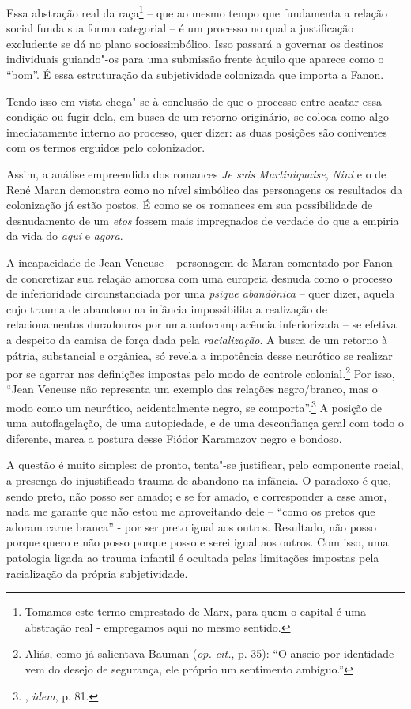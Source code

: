 Essa abstração real da raça\footnote{Tomamos este termo emprestado de
  Marx, para quem o capital é uma abstração real - empregamos aqui no
  mesmo sentido.} -- que ao mesmo tempo que fundamenta a relação social
funda sua forma categorial -- é um processo no qual a justificação
excludente se dá no plano sociossimbólico. Isso passará a governar os
destinos individuais guiando"-os para uma submissão frente àquilo que
aparece como o ``bom''. É essa estruturação da subjetividade colonizada
que importa a Fanon.

Tendo isso em vista chega"-se à conclusão de que o processo entre acatar
essa condição ou fugir dela, em busca de um retorno originário, se
coloca como algo imediatamente interno ao processo, quer dizer: as duas
posições são coniventes com os termos erguidos pelo colonizador.

Assim, a análise empreendida dos romances \emph{Je suis Martiniquaise},
\emph{Nini} e o de René Maran demonstra como no nível simbólico das
personagens os resultados da colonização já estão postos. É como se os
romances em sua possibilidade de desnudamento de um \emph{etos} fossem
mais impregnados de verdade do que a empiria da vida do \emph{aqui} e
\emph{agora}.

A incapacidade de Jean Veneuse -- personagem de Maran comentado por
Fanon -- de concretizar sua relação amorosa com uma europeia desnuda
como o processo de inferioridade circunstanciada por uma \emph{psique
abandônica} -- quer dizer, aquela cujo trauma de abandono na infância
impossibilita a realização de relacionamentos duradouros por uma
autocomplacência inferiorizada -- se efetiva a despeito da camisa de
força dada pela \emph{racialização}. A busca de um retorno à pátria,
substancial e orgânica, só revela a impotência desse neurótico se
realizar por se agarrar nas definições impostas pelo modo de controle
colonial.\footnote{Aliás, como já salientava Bauman (\emph{op. cit.}, p. 35):
  ``O anseio por identidade vem do desejo de segurança, ele próprio um
  sentimento ambíguo.''} Por isso, ``Jean Veneuse não representa um
exemplo das relações negro/branco, mas o modo como um neurótico,
acidentalmente negro, se comporta''.\footnote{, \emph{idem}, p. 81.} A
posição de uma autoflagelação, de uma autopiedade, e de uma desconfiança
geral com todo o diferente, marca a postura desse Fiódor Karamazov negro
e bondoso.

A questão é muito simples: de pronto, tenta"-se justificar, pelo
componente racial, a presença do injustificado trauma de abandono na
infância. O paradoxo é que, sendo preto, não posso ser amado; e se for
amado, e corresponder a esse amor, nada me garante que não estou me
aproveitando dele -- ``como os pretos que adoram carne branca'' - por
ser preto igual aos outros. Resultado, não posso porque quero e não
posso porque posso e serei igual aos outros. Com isso, uma patologia
ligada ao trauma infantil é ocultada pelas limitações impostas pela
racialização da própria subjetividade.

